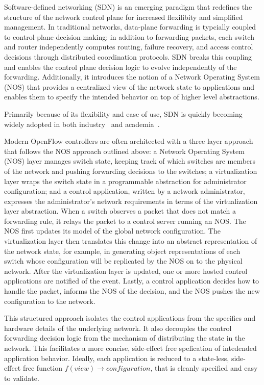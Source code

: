 Software-defined networking (SDN) is an emerging paradigm that redefines
the structure of the network control plane for increased flexilibity and
simplified management. In traditional networks, data-plane forwarding is
typcially coupled to control-plane decision making; in addition to forwarding
packets, each switch and router independently computes routing, failure
recovery, and access control decisions through distributed coordination protocols.
SDN breaks this coupling and enables the control plane decision logic to evolve
independently of the forwarding. Additionally, it introduces the notion of a
Network Operating System (NOS) that provides a centralized view of the network
state to applications and enables them to specify the intended behavior on top
of higher level abstractions.

Primarily because of its flexibility and ease of use, SDN
is quickly becoming widely adopted in both industry~\cite{nicirahomepage,
bigswitch} and academia~\cite{nox, pox, ethane}.

Modern OpenFlow controllers are often architected with a three layer approach
that follows the NOS approach outlined above: a Network Operating System (NOS)
layer manages switch state, keeping track of which switches are members of the
network and pushing forwarding decisions to the switches; a virtualization layer
wraps the switch state in a programmable abstraction for administrator
configuration; and a control application, written by a network administrator,
expresses the administrator's network requirements in terms of the
virtualization layer abstraction. When a switch observes a packet that does not
match a forwarding rule, it relays the packet to a control server running an
NOS. The NOS first updates its model of the global network configuration. The
virtualization layer then translates this change into an abstract representation
of the network state, for example, in generating object representations of each
switch whose configuration will be replicated by the NOS on to the physical
network. After the virtualization layer is updated, one or more hosted control
applications are notified of the event. Lastly, a control application decides
how to handle the packet, informs the NOS of the decision, and the NOS pushes
the new configuration to the network. 

This structured approach isolates the control applications from the specifics
and hardware details of the underlying network. It also decouples the control
forwarding decision logic from the mechanism of distributing the state in the
network. This facilitates a more concise, side-effect free spefication of
intedended application behavior. Ideally, each application is reduced to a
state-less, side-effect free function $f(view) \rightarrow configuration$, that is
cleanly specified and easy to validate.

